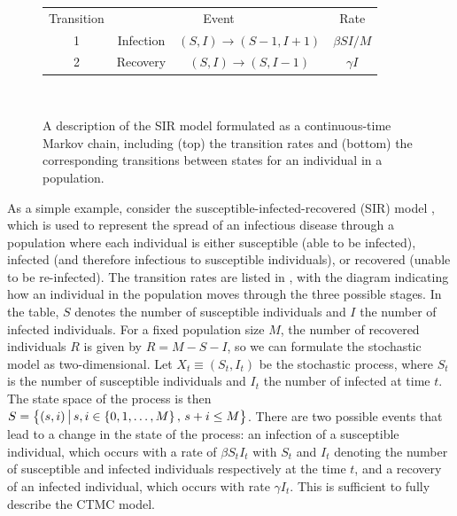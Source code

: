 \usetikzlibrary{automata,positioning,arrows}
\tikzset{->, node distance = 2cm}
\begin{figure}
	\begin{center}
		\begin{tabular}{|c|c|c|c|}
			\hline
			Transition & \multicolumn{2}{c|}{Event} & Rate                                                                  \\ \hhline{|=|=|=|=|}
			1          & Infection                  & \(\left(S, I\right) \to \left(S-1, I + 1\right)\) & \(\beta S I / M\) \\ \hline
			2          & Recovery                   & \(\left(S,I\right) \to \left(S, I - 1\right)\)    & \(\gamma I\)      \\ \hline
		\end{tabular} \\
		\vspace{2mm}
		\caption{A description of the SIR model formulated as a continuous-time Markov chain, including (top) the transition rates and (bottom) the corresponding transitions between states for an individual in a population.}
		\label{fig:sir_transition}
	\end{center}
\end{figure}

As a simple example, consider the susceptible-infected-recovered (SIR) model \citep{Allen_2017_PrimerStochasticEpidemic}, which is used to represent the spread of an infectious disease through a population where each individual is either susceptible (able to be infected), infected (and therefore infectious to susceptible individuals), or recovered (unable to be re-infected).
The transition rates are listed in , with the diagram indicating how an individual in the population moves through the three possible stages.
In the table, \(S\) denotes the number of susceptible individuals and \(I\) the number of infected individuals.
For a fixed population size \(M\), the number of recovered individuals \(R\) is given by \(R = M - S - I\), so we can formulate the stochastic model as two-dimensional.
Let \(X_t \equiv \left(S_t,I_t\right)\) be the stochastic process, where \(S_t\) is the number of susceptible individuals and \(I_t\) the number of infected at time \(t\).
The state space of the process is then \(S = \left\{(s,i)\,\middle|\,s,i\in\set{0,1,\dotsc,M}, \, s + i \leq M\right\}\).
There are two possible events that lead to a change in the state of the process: an infection of a susceptible individual, which occurs with a rate of \(\beta S_t I_t\) with \(S_t\) and \(I_t\) denoting the number of susceptible and infected individuals respectively at the time \(t\), and a recovery of an infected individual, which occurs with rate \(\gamma I_t\).
This is sufficient to fully describe the CTMC model.

